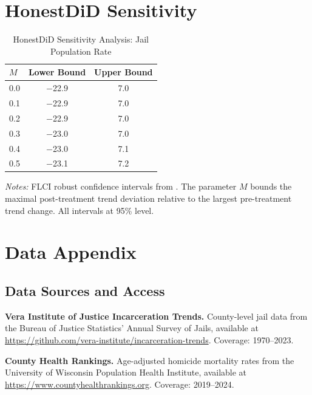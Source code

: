 \documentclass[12pt]{article}
\begin{document}
\section{HonestDiD Sensitivity}

\begin{table}[H]
\centering
\caption{HonestDiD Sensitivity Analysis: Jail Population Rate}
\label{tab:honestdid}
\begin{threeparttable}
\begin{tabular}{lcc}
\toprule
$M$ & Lower Bound & Upper Bound \\
\midrule
0.0 & $-$22.9 & 7.0 \\
0.1 & $-$22.9 & 7.0 \\
0.2 & $-$22.9 & 7.0 \\
0.3 & $-$23.0 & 7.0 \\
0.4 & $-$23.0 & 7.1 \\
0.5 & $-$23.1 & 7.2 \\
\bottomrule
\end{tabular}
\begin{tablenotes}[flushleft]
\small
\item \textit{Notes:} FLCI robust confidence intervals from \citet{rambachan2023honest}. The parameter $M$ bounds the maximal post-treatment trend deviation relative to the largest pre-treatment trend change. All intervals at 95\% level.
\end{tablenotes}
\end{threeparttable}
\end{table}

\section{Data Appendix}

\subsection{Data Sources and Access}

\textbf{Vera Institute of Justice Incarceration Trends.} County-level jail data from the Bureau of Justice Statistics' Annual Survey of Jails, available at \url{https://github.com/vera-institute/incarceration-trends}. Coverage: 1970--2023.

\textbf{County Health Rankings.} Age-adjusted homicide mortality rates from the University of Wisconsin Population Health Institute, available at \url{https://www.countyhealthrankings.org}. Coverage: 2019--2024.
\end{document}

